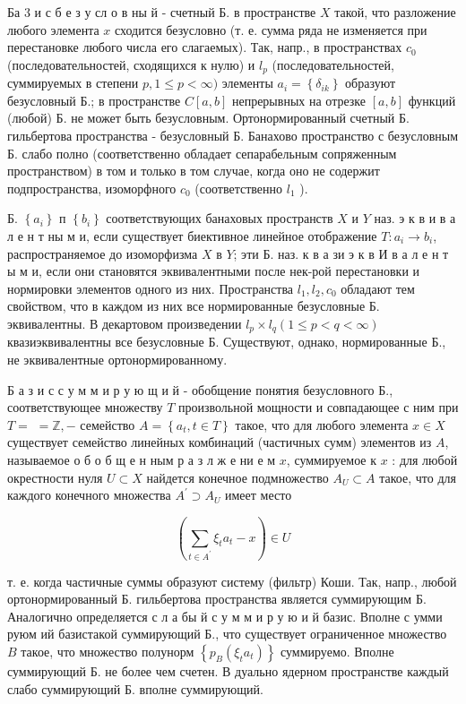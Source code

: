 \documentclass[10pt]{article}
\begin{document}
Ба 3 и с б е з у сл о в ны й - счетный Б. в пространстве $X$ такой, что разложение любого элемента $x$ сходится безусловно (т. е. сумма ряда не изменяется при перестановке любого числа его слагаемых). Так, напр., в пространствах $c_{0}$ (последовательностей, сходящихся к нулю) и $l_{p}$ (последовательностей, суммируемых в степени $p, 1 \leqslant p<\infty)$ элементы $a_{i}=\left\{\delta_{i k}\right\}$ образуют безусловный Б.; в пространстве $C[a, b]$ непрерывных на отрезке $[a, b]$ функций (любой) Б. не может быть безусловным. Ортонормированный счетный Б. гильбертова пространства - безусловный Б. Банахово пространство с безусловным Б. слабо полно (соответственно обладает сепарабельным сопряженным пространством) в том и только в том случае, когда оно не содержит подпространства, изоморфного $c_{0}$ (соответственно $l_{1}$ ).



Б. $\left\{a_{i}\right\}$ п $\left\{b_{i}\right\}$ соответствующих банаховых пространств $X$ и $Y$ наз. э к в и в а л е н т ны м и, если существует биективное линейное отображение $T: a_{i} \rightarrow b_{i}$, распространяемое до изоморфизма $X$ в $Y$; эти Б. наз. к в а зи э к в И в а л е н т ы м и, если они становятся эквивалентными после нек-рой перестановки и нормировки элементов одного из них. Пространства $l_{1}, l_{2}, c_{0}$ обладают тем свойством, что в каждом из них все нормированные безусловные Б. эквивалентны. В декартовом произведении $l_{p} \times l_{q}(1 \leqslant p<q<\infty)$ квазиэквивалентны все безусловные Б. Существуют, однако, нормированные Б., не эквивалентные ортонормированному.



Б а з и с с у м м и р у ю щ и й - обобщение понятия безусловного Б., соответствующее множеству $T$ произвольной мощности и совпадающее с ним при $T=$ $=\mathbb{Z},-$ семейство $A=\left\{a_{t}, t \in T\right\}$ такое, что для любого элемента $x \in X$ существует семейство линейных комбинаций (частичных сумм) элементов из $A$, называемое о б о б щ е н ным р а з л ж е ни е м $x$, суммируемое к $x$ : для любой окрестности нуля $U \subset X$ найдется конечное подмножество $A_{U} \subset A$ такое, что для каждого конечного множества $A^{\prime} \supset A_{U}$ имеет место



\[

\left(\sum_{t \in A^{\prime}} \xi_{t} a_{t}-x\right) \in U

\]



т. е. когда частичные суммы образуют систему (фильтр) Коши. Так, напр., любой ортонормированный Б. гильбертова пространства является суммирующим Б. Аналогично определяется с л а бы й с у м м и р у ю и й базис. Вполне с умми руюм ий базистакой суммирующий Б., что существует ограниченное множество $B$ такое, что множество полунорм $\left\{p_{B}\left(\xi_{t} a_{t}\right)\right\}$ суммируемо. Вполне суммирующий Б. не более чем счетен. В дуально ядерном пространстве каждый слабо суммирующий Б. вполне суммирующий.
\end{document}
